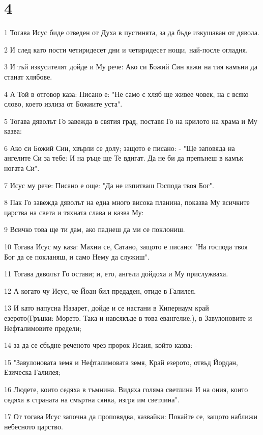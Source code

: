 \chapter{4}

\par 1 Тогава Исус биде отведен от Духа в пустинята, за да бъде изкушаван от дявола.
\par 2 И след като пости четиридесет дни и четиридесет нощи, най-после огладня.
\par 3 И тъй изкусителят дойде и Му рече: Ако си Божий Син кажи на тия камъни да станат хлябове.
\par 4 А Той в отговор каза: Писано е: "Не само с хляб ще живее човек, на с всяко слово, което излиза от Божиите уста".
\par 5 Тогава дяволът Го завежда в святия град, поставя Го на крилото на храма и Му казва:
\par 6 Ако си Божий Син, хвърли се долу; защото е писано: - "Ще заповяда на ангелите Си за тебе: И на ръце ще Те вдигат. Да не би да препънеш в камък ногата Си".
\par 7 Исус му рече: Писано е още: "Да не изпитваш Господа твоя Бог".
\par 8 Пак Го завежда дяволът на една много висока планина, показва Му всичките царства на света и тяхната слава и казва Му:
\par 9 Всичко това ще ти дам, ако паднеш да ми се поклониш.
\par 10 Тогава Исус му каза: Махни се, Сатано, защото е писано: "На господа твоя Бог да се покланяш, и само Нему да служиш".
\par 11 Тогава дяволът Го остави; и, ето, ангели дойдоха и Му прислужваха.
\par 12 А когато чу Исус, че Йоан бил предаден, отиде в Галилея.
\par 13 И като напусна Назарет, дойде и се настани в Кипернаум край езерото(Гръцки: Морето. Така и навсякъде в това евангелие.), в Завулоновите и Нефталимовите предели;
\par 14 за да се сбъдне реченото чрез пророк Исаия, който казва: -
\par 15 "Завулоновата земя и Нефталимовата земя, Край езерото, отвъд Йордан, Езическа Галилея;
\par 16 Людете, които седяха в тъмнина. Видяха голяма светлина И на ония, които седяха в страната на смъртна сянка, изгря им светлина".
\par 17 От тогава Исус започна да проповядва, казвайки: Покайте се, защото наближи небесното царство.

